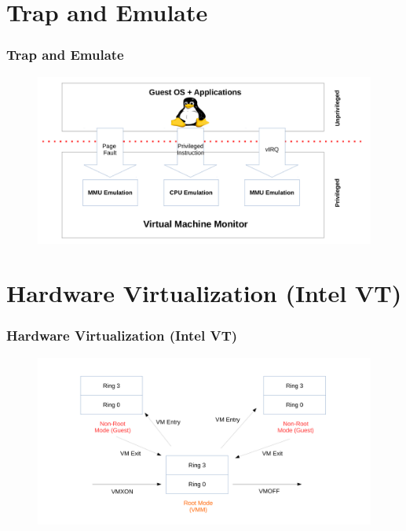 \documentclass[aspectratio=169]{beamer}
\begin{document}

\section{Trap and Emulate}
\begin{frame}
\frametitle{Trap and Emulate}
\begin{figure}
\includegraphics[width=1.0\linewidth]{figures/trapemu.pdf}
\end{figure}
\end{frame}


\section{Hardware Virtualization (Intel VT)}
\begin{frame}
\frametitle{Hardware Virtualization (Intel VT)}
\begin{figure}
\includegraphics[width=1.0\linewidth]{figures/vmx.pdf}
\end{figure}
\end{frame}

\end{document}
